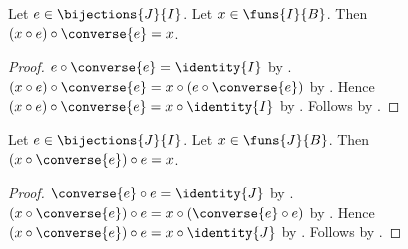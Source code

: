 \begin{lemma}\label{spike_reindexed_section_round_trip}
    Let $e\in\bijections{J}{I}$.
    Let $x\in\funs{I}{B}$.
    Then $(x\circ e)\circ\converse{e}=x$.
\end{lemma}
\begin{proof}
    $e\circ\converse{e}=\identity{I}$ by
        .
    $(x\circ e)\circ\converse{e}
        =x\circ(e\circ\converse{e})$ by .
    Hence $(x\circ e)\circ\converse{e}
        =x\circ\identity{I}$ by \auto.
    Follows by .
\end{proof}

\begin{lemma}\label{spike_reverse_reindexed_section_round_trip}
    Let $e\in\bijections{J}{I}$.
    Let $x\in\funs{J}{B}$.
    Then $(x\circ\converse{e})\circ e=x$.
\end{lemma}
\begin{proof}
    $\converse{e}\circ e=\identity{J}$ by
        .
    $(x\circ\converse{e})\circ e
        =x\circ(\converse{e}\circ e)$ by .
    Hence $(x\circ\converse{e})\circ e
        =x\circ\identity{J}$ by \auto.
    Follows by .
\end{proof}


